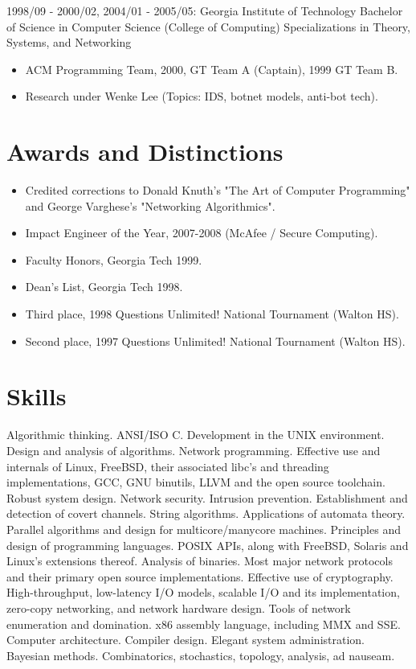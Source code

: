 \documentclass{article}
\begin{document}
1998/09 - 2000/02, 2004/01 - 2005/05: Georgia Institute of Technology
Bachelor of Science in Computer Science (College of Computing)
Specializations in Theory, Systems, and Networking

\begin{itemize}
\item ACM Programming Team, 2000, GT Team A (Captain), 1999 GT Team B.
\item Research under Wenke Lee (Topics: IDS, botnet models, anti-bot tech).
\end{itemize}

\section{Awards and Distinctions}

\begin{itemize}
\item Credited corrections to Donald Knuth's "The Art of Computer Programming"
   and George Varghese's "Networking Algorithmics".
\item Impact Engineer of the Year, 2007-2008 (McAfee / Secure Computing).
\item Faculty Honors, Georgia Tech 1999.
\item Dean's List, Georgia Tech 1998.
\item Third place, 1998 Questions Unlimited! National Tournament (Walton HS).
\item Second place, 1997 Questions Unlimited! National Tournament (Walton HS).
\end{itemize}

\section{Skills}

Algorithmic thinking. ANSI/ISO C. Development in the UNIX environment. Design
and analysis of algorithms. Network programming. Effective use and internals
of Linux, FreeBSD, their associated libc's and threading implementations,
GCC, GNU binutils, LLVM and the open source toolchain. Robust system design.
Network security. Intrusion prevention. Establishment and detection of covert
channels. String algorithms. Applications of automata theory. Parallel
algorithms and design for multicore/manycore machines. Principles and design
of programming languages. POSIX APIs, along with FreeBSD, Solaris and Linux's
extensions thereof. Analysis of binaries. Most major network protocols and
their primary open source implementations. Effective use of cryptography.
High-throughput, low-latency I/O models, scalable I/O and its implementation,
zero-copy networking, and network hardware design. Tools of network
enumeration and domination. x86 assembly language, including MMX and SSE.
Computer architecture. Compiler design. Elegant system administration.
Bayesian methods. Combinatorics, stochastics, topology, analysis, ad nauseam.
\end{document}
